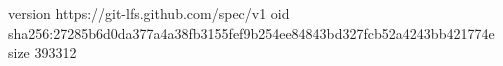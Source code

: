 version https://git-lfs.github.com/spec/v1
oid sha256:27285b6d0da377a4a38fb3155fef9b254ee84843bd327fcb52a4243bb421774e
size 393312
